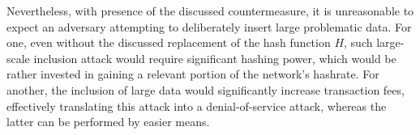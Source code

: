 \documentclass[a4paper,11pt,titlepage]{scrbook}
\begin{document}


Nevertheless, with presence of the discussed countermeasure, it is unreasonable to expect an adversary attempting to deliberately insert large problematic data.
For one, even without the discussed replacement of the hash function $H$, such large-scale inclusion attack would require significant hashing power, which would be rather invested in gaining a relevant portion of the network's hashrate.
For another, the inclusion of large data would significantly increase transaction fees, effectively translating this attack into a denial-of-service attack, whereas the latter can be performed by easier means.





\backmatter

 \label{listoffig}
\listoffigures
\cleardoublepage
{} \label{listoftab}
\listoftables

\cleardoublepage
{} \label{biblio}
\printbibliography[title=References]

												  

%
\end{document}
